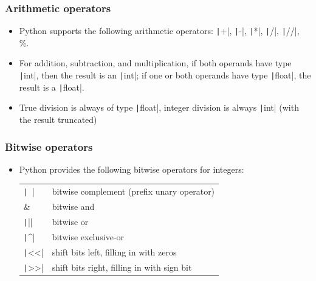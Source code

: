 \begin{frame}
    \frametitle{Arithmetic operators}

    \begin{itemize}
        \item Python supports the following arithmetic operators: \texttt|+|, \texttt|-|, \texttt|*|, \texttt|/|, \texttt|//|, \footnotesize{\%}.
        \item For addition, subtraction, and multiplication, if both operands have type \texttt|int|, then the result is an \texttt|int|; if one or both operands have type \texttt|float|, the result is a \texttt|float|.
        \item True division is always of type \texttt|float|, integer division is always \texttt|int| (with the result truncated)

    \end{itemize}

\end{frame}

\begin{frame}
    \frametitle{Bitwise operators}

    \begin{itemize}
        \item Python provides the following bitwise operators for integers:
              \begin{table}[htbp]
                  \centering
                  \begin{tabular}{ll}
                      \texttt|~|  & bitwise complement (prefix unary operator) \\
                      \&                      & bitwise and                                \\
                      \texttt|||  & bitwise or                                 \\
                      \texttt|^|  & bitwise exclusive-or                       \\
                      \texttt|<<| & shift bits left, filling in with zeros     \\
                      \texttt|>>| & shift bits right, filling in with sign bit \\
                  \end{tabular}%
              \end{table}%

    \end{itemize}

\end{frame}

